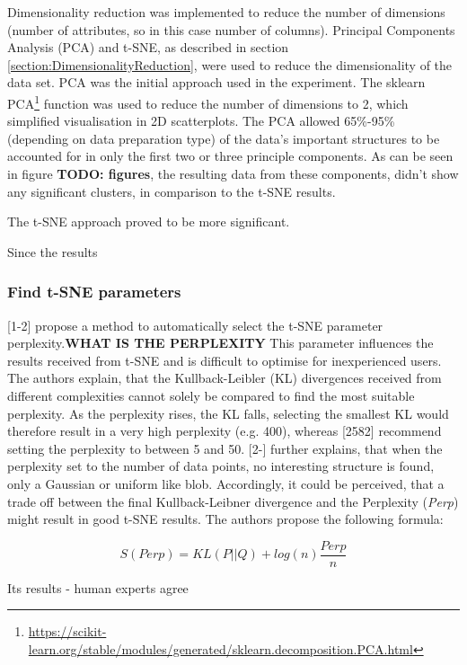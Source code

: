 
Dimensionality reduction was implemented to reduce the number of dimensions (number of attributes, so in this case number of columns). Principal Components Analysis (PCA) and t-SNE, as described in section \ref{section:DimensionalityReduction}, were used to reduce the dimensionality of the data set. PCA was the initial approach used in the experiment. The sklearn PCA\footnote{\url{https://scikit-learn.org/stable/modules/generated/sklearn.decomposition.PCA.html}} function was used to reduce the number of dimensions to 2, which simplified visualisation in 2D scatterplots. The PCA allowed 65\%-95\% (depending on data preparation type) of the data's important structures to be accounted for in only the first two or three principle components. As can be seen in figure \textbf{TODO: figures}, the resulting data from these components, didn't show any significant clusters, in comparison to the t-SNE results.

The t-SNE approach proved to be more significant.

Since the results 


\subsubsection{Find t-SNE parameters}
\textcite{tsneAutomaticPerplexity}[1-2] propose a method to automatically select the t-SNE parameter perplexity.\textbf{WHAT IS THE PERPLEXITY} This parameter influences the results received from t-SNE and is difficult to optimise for inexperienced users. The authors explain, that the Kullback-Leibler (KL) divergences received from different complexities cannot solely be compared to find the most suitable perplexity. As the perplexity rises, the KL falls, selecting the smallest KL would therefore result in a very high perplexity (e.g. 400), whereas \textcite{maaten2008visualizing}[2582] recommend setting the perplexity to between 5 and 50. \textcite{tsneAutomaticPerplexity}[2-] further explains, that when the perplexity set to the number of data points, no interesting structure is found, only a Gaussian or uniform like blob. Accordingly, it could be perceived, that a trade off between the final Kullback-Leibner divergence and the Perplexity (\textit{Perp}) might result in good t-SNE results. The authors propose the following formula:

\[
  S(Perp) = KL(P||Q) + log(n)\frac{Perp}{n}
\]

Its results - human experts agree
